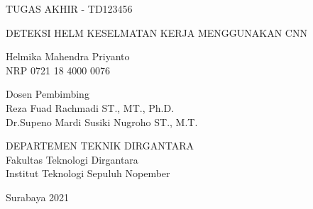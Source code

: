 TUGAS AKHIR - TD123456

\vspace{6ex}

\begin{large}
  DETEKSI HELM KESELMATAN KERJA MENGGUNAKAN CNN
\end{large}

\vspace{4ex}

Helmika Mahendra Priyanto \\
NRP 0721 18 4000 0076

\vspace{2ex}

Dosen Pembimbing \\
Reza Fuad Rachmadi ST., MT., Ph.D. \\
Dr.Supeno Mardi Susiki Nugroho ST., M.T.

\vspace{6ex}

DEPARTEMEN TEKNIK DIRGANTARA \\
Fakultas Teknologi Dirgantara \\
Institut Teknologi Sepuluh Nopember

Surabaya 2021

